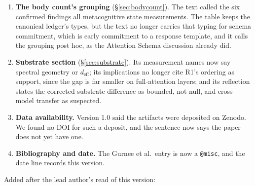 \documentclass[11pt,a4paper]{article}
\begin{document}
\begin{enumerate}[nosep,leftmargin=*]
  as in the canonical ledger. The setup's FWL sentence no longer claims
  FWL for every AUROC, since the paper also reports AUROCs without it.
  A first-person reflection in \S\ref{sec:substrate} now says the
  exploratory correction missed its confirmatory endpoint.
\item \textbf{The body count's grouping} (\S\ref{sec:bodycount}). The
  text called the six confirmed findings all metacognitive state
  measurements. The table keeps the canonical ledger's types, but the text
  no longer carries that typing for schema commitment, which is early
  commitment to a response template, and it calls the grouping post hoc,
  as the Attention Schema discussion already did.
\item \textbf{Substrate section} (\S\ref{sec:substrate}). Its measurement
  names now say spectral geometry or $d_\text{eff}$; its implications no
  longer cite R1's ordering as support, since the gap is far smaller on
  full-attention layers; and its reflection states the corrected substrate
  difference as bounded, not null, and cross-model transfer as suspected.
\item \textbf{Data availability.} Version 1.0 said the artifacts were
  deposited on Zenodo. We found no DOI for such a deposit, and the
  sentence now says the paper does not yet have one.
\item \textbf{Bibliography and date.} The Gurnee et al.\ entry is now a
  \texttt{@misc}, and the date line records this version.
\end{enumerate}

\noindent Added after the lead author's read of this version:
\end{document}
